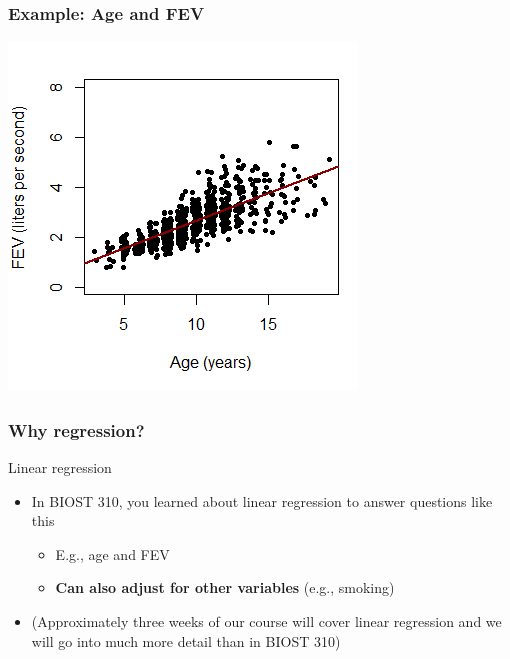 \documentclass[12pt, 
hyperref={colorlinks=true, linkcolor=blue, urlcolor=cyan}]{beamer}
\begin{document}
\begin{frame}
\frametitle{Example: Age and FEV} %
\center \includegraphics[height=0.9\textheight]{./intro_scatterplot} %
\end{frame}

\begin{frame}
\frametitle{Why regression?} 
Linear regression
\begin{itemize}
\item In BIOST 310, you learned about linear regression to answer questions like this
	\begin{itemize} 
	\item E.g., age and FEV
	\item \textbf{Can also adjust for other variables} (e.g., smoking) %
	\end{itemize}
\item (Approximately three weeks of our course will cover linear regression and we will go into much more detail than in BIOST 310)
\end{itemize}
\end{frame}
\end{document}
